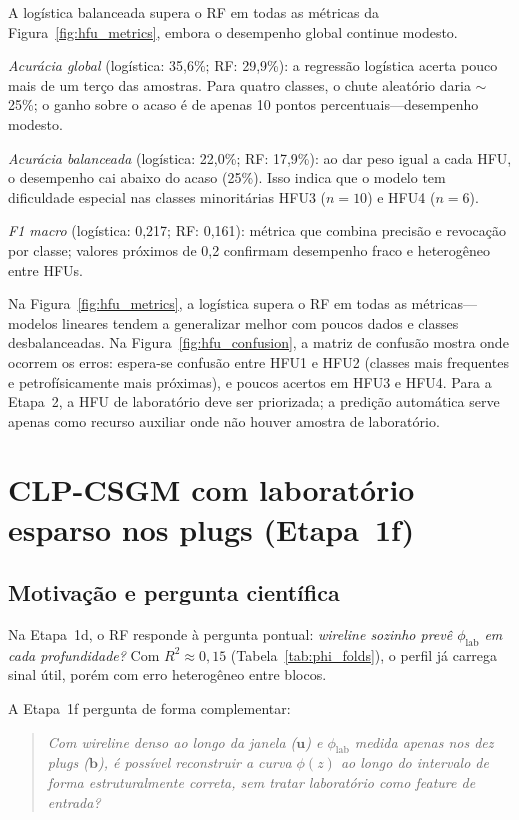 \documentclass[11pt,a4paper]{article}
\newcommand{\philab}{\ensuremath{\phi_{\mathrm{lab}}}}
\begin{document}
A logística balanceada supera o RF em todas as métricas da Figura~\ref{fig:hfu_metrics}, embora o desempenho global continue modesto.

\emph{Acurácia global} (logística: 35,6\%; RF: 29,9\%): a regressão
logística acerta pouco mais de um terço das amostras.
Para quatro classes, o chute aleatório daria $\sim$25\%; o ganho sobre o
acaso é de apenas 10 pontos percentuais---desempenho modesto.

\emph{Acurácia balanceada} (logística: 22,0\%; RF: 17,9\%): ao dar peso
igual a cada HFU, o desempenho cai abaixo do acaso (25\%).
Isso indica que o modelo tem dificuldade especial nas classes minoritárias
HFU3 ($n=10$) e HFU4 ($n=6$).

\emph{F1 macro} (logística: 0,217; RF: 0,161): métrica que combina
precisão e revocação por classe; valores próximos de 0,2 confirmam
desempenho fraco e heterogêneo entre HFUs.

Na Figura~\ref{fig:hfu_metrics}, a logística supera o RF em todas as
métricas---modelos lineares tendem a generalizar melhor com poucos dados
e classes desbalanceadas.
Na Figura~\ref{fig:hfu_confusion}, a matriz de confusão mostra onde ocorrem
os erros: espera-se confusão entre HFU1 e HFU2 (classes mais frequentes e
petrofísicamente mais próximas), e poucos acertos em HFU3 e HFU4.
Para a Etapa~2, a HFU de laboratório deve ser priorizada; a predição
automática serve apenas como recurso auxiliar onde não houver amostra de
laboratório.

\section{CLP-CSGM com laboratório esparso nos plugs (Etapa~1f)}
\label{sec:clp}

\subsection{Motivação e pergunta científica}

Na Etapa~1d, o RF responde à pergunta pontual: \emph{wireline sozinho
prevê \philab{} em cada profundidade?}
Com $R^2 \approx 0{,}15$ (Tabela~\ref{tab:phi_folds}), o perfil já
carrega sinal útil, porém com erro heterogêneo entre blocos.

A Etapa~1f pergunta de forma complementar:

\begin{quote}
\emph{Com wireline denso ao longo da janela ($\mathbf{u}$) e \philab{}
medida apenas nos dez plugs ($\mathbf{b}$), é possível reconstruir a
\emph{curva} $\phi(z)$ ao longo do intervalo de forma estruturalmente
correta, sem tratar laboratório como feature de entrada?}
\end{quote}
\end{document}
